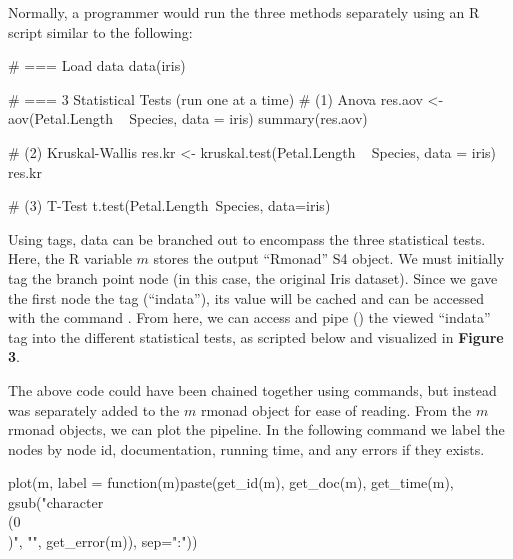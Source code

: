 Normally, a programmer would run the three methods separately using an R script similar to the following:

\begin{example}
# === Load data
data(iris)

# === 3 Statistical Tests (run one at a time)
# (1) Anova
res.aov <- aov(Petal.Length ~ Species, data = iris)
summary(res.aov)

# (2) Kruskal-Wallis
res.kr <- kruskal.test(Petal.Length ~ Species, data = iris)
res.kr

# (3) T-Test
t.test(Petal.Length~Species, data=iris)
\end{example}

Using  tags, data can be branched out to encompass the three
statistical tests. Here, the R variable $m$ stores the output ``Rmonad'' S4
object. We must initially tag the branch point node (in this case, the original
Iris dataset). Since we gave the first node the tag (``indata''), its
value will be cached and can be accessed with the command . From here, we can access and pipe (\code{\%>{}>\%}) the viewed
``indata'' tag into the different statistical tests, as scripted below and
visualized in \textbf{Figure 3}.


The above code could have been chained together using  commands, but instead was separately added to the $m$
rmonad object for ease of reading. From the $m$ rmonad objects, we can plot the
pipeline. In the following command we label the nodes by node id,
documentation, running time, and any errors if they exists.

\begin{example}
plot(m, label = function(m){paste(get_id(m),
                                  get_doc(m), 
                                  get_time(m),
                                  gsub("character\\(0\\)", "", get_error(m)), 
                                  sep=":")})
\end{example}

